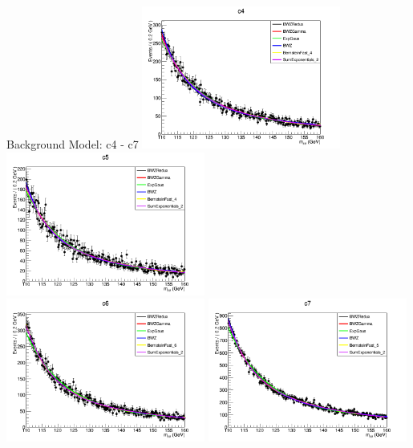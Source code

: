\documentclass[pdf, 9pt]{beamer}
\begin{document}
  \begin{frame}{Background Model: c4 - c7}
    \includegraphics[width=0.49\textwidth, height=0.45\textheight]{figs/higgs/backgroundmodel/uf_bdt/backgroundFits__c4__bkgModels.png}
    \includegraphics[width=0.49\textwidth, height=0.45\textheight]{figs/higgs/backgroundmodel/uf_bdt/backgroundFits__c5__bkgModels.png}\\
    \includegraphics[width=0.49\textwidth, height=0.45\textheight]{figs/higgs/backgroundmodel/uf_bdt/backgroundFits__c6__bkgModels.png}
    \includegraphics[width=0.49\textwidth, height=0.45\textheight]{figs/higgs/backgroundmodel/uf_bdt/backgroundFits__c7__bkgModels.png}
  \end{frame}
\end{document}
